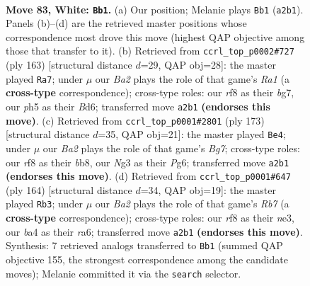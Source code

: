 \documentclass[11pt]{article}
\begin{document}
\clearpage

\begin{figure}[p]\centering
\begin{subfigure}{0.46\textwidth}\centering
\resizebox{\linewidth}{!}{%
\newchessgame
\chessboard[
  setfen={5r2/5p2/n5p1/4P2p/b2k1Pp1/6N1/B6P/6K1 w - - 24 83},
  showmover=false,
  pgfstyle=straightmove, color=movearrow, markmove={a2-b1}
]}
\caption{}
\end{subfigure}\hfill
\begin{subfigure}{0.46\textwidth}\centering
\resizebox{\linewidth}{!}{%
\newchessgame
\chessboard[
  setfen={r7/6B1/3bk1p1/7p/1p5P/1K4P1/2P2P2/3R4 b - - 26 82},
  showmover=false,
  pgfstyle=straightmove, color=movearrow, markmove={a8-a7}
]}
\caption{}
\end{subfigure}
\\[4pt]
\begin{subfigure}{0.46\textwidth}\centering
\resizebox{\linewidth}{!}{%
\newchessgame
\chessboard[
  setfen={1B6/1p6/1K2k1p1/P3P2p/2p5/2P3P1/6bP/8 b - - 62 87},
  showmover=false,
  pgfstyle=straightmove, color=movearrow, markmove={g2-e4}
]}
\caption{}
\end{subfigure}\hfill
\begin{subfigure}{0.46\textwidth}\centering
\resizebox{\linewidth}{!}{%
\newchessgame
\chessboard[
  setfen={5k2/1R3p2/r5p1/7p/5N1P/4nPP1/4P3/4K3 w - - 5 83},
  showmover=false,
  pgfstyle=straightmove, color=movearrow, markmove={b7-b3}
]}
\caption{}
\end{subfigure}
\caption{\textbf{Move 83, White: \texttt{Bb1}.} (a) Our position; Melanie plays \texttt{Bb1} (\texttt{a2b1}). Panels (b)--(d) are the retrieved master positions whose correspondence most drove this move (highest QAP objective among those that transfer to it). (b) Retrieved from \texttt{ccrl\_top\_p0002\#727} (ply 163) [structural distance $d$=29, QAP obj=28]: the master played \texttt{Ra7}; under $\mu$ our \emph{Ba2} plays the role of that game's \emph{Ra1} (a \textbf{cross-type} correspondence); cross-type roles: our \emph{r}f8 as their \emph{b}g7, our \emph{p}h5 as their \emph{B}d6; transferred move \texttt{a2b1} \textbf{(endorses this move)}. (c) Retrieved from \texttt{ccrl\_top\_p0001\#2801} (ply 173) [structural distance $d$=35, QAP obj=21]: the master played \texttt{Be4}; under $\mu$ our \emph{Ba2} plays the role of that game's \emph{Bg7}; cross-type roles: our \emph{r}f8 as their \emph{b}b8, our \emph{N}g3 as their \emph{P}g6; transferred move \texttt{a2b1} \textbf{(endorses this move)}. (d) Retrieved from \texttt{ccrl\_top\_p0001\#647} (ply 164) [structural distance $d$=34, QAP obj=19]: the master played \texttt{Rb3}; under $\mu$ our \emph{Ba2} plays the role of that game's \emph{Rb7} (a \textbf{cross-type} correspondence); cross-type roles: our \emph{r}f8 as their \emph{n}e3, our \emph{b}a4 as their \emph{r}a6; transferred move \texttt{a2b1} \textbf{(endorses this move)}. Synthesis: 7 retrieved analogs transferred to \texttt{Bb1} (summed QAP objective 155, the strongest correspondence among the candidate moves); Melanie committed it via the \texttt{search} selector.}
\label{fig:thought-m164}
\end{figure}
\end{document}
